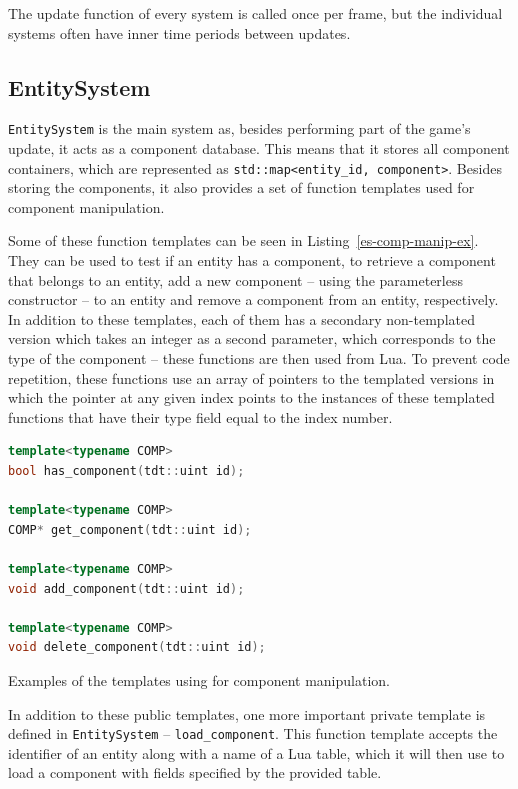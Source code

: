 The update function of every system is called once per frame, but the individual systems often have inner time periods between updates.

\subsection{EntitySystem}

\texttt{EntitySystem} is the main system as, besides performing part of the game's update, it acts as a component database. This means that
it stores all component containers, which are represented as \texttt{std::map<entity\_id, component>}. Besides storing the components,
it also provides a set of function templates used for component manipulation.

Some of these function templates can be seen in Listing~\ref{es-comp-manip-ex}. They can be used to test if an entity has a component,
to retrieve a component
that belongs to an entity, add a new component -- using the parameterless constructor -- to an entity and remove a component from an entity,
respectively. In addition to these templates, each of them has a secondary non-templated version which takes an integer as a second parameter,
which corresponds to the type of the component -- these functions are then used from Lua.
To prevent code repetition, these functions use an array of pointers to the templated versions in which the pointer at any given index points
to the instances of these templated functions that have their type field equal to the index number.

\begin{listing}[h]
    \centering
    \begin{lstlisting}[language=C++]
template<typename COMP>
bool has_component(tdt::uint id);

template<typename COMP>
COMP* get_component(tdt::uint id);

template<typename COMP>
void add_component(tdt::uint id);

template<typename COMP>
void delete_component(tdt::uint id);
    \end{lstlisting}
    \caption{Examples of the templates using for component manipulation.}
    \label{es-comp-manip-ex}
\end{listing}

In addition to these public templates, one more important private template is defined in \texttt{EntitySystem} -- \texttt{load\_component}.
This function template accepts the identifier of an entity along with a name of a Lua table, which it will then use to load a component
with fields specified by the provided table.

